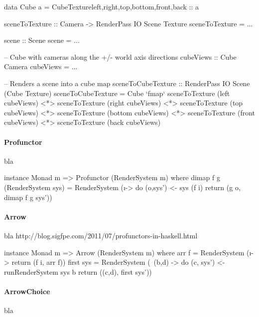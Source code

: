 \begin{haskell}[label={lst:rendersystem-applicative-beispiel},caption={Applicative RenderSystem Beispiel}]
data Cube a = CubeTexture{left,right,top,bottom,front,back :: a}

sceneToTexture :: Camera -> RenderPass IO Scene Texture
sceneToTexture = ...

scene :: Scene
scene = ...

-- Cube with cameras along the +/- world axis directions
cubeViews :: Cube Camera
cubeViews = ...

-- Renders a scene into a cube map
sceneToCubeTexture :: RenderPass IO Scene (Cube Texture)
sceneToCubeTexture = Cube
	`fmap` sceneToTexture (left cubeViews)
	<*> sceneToTexture (right  cubeViews)
	<*> sceneToTexture (top    cubeViews)
	<*> sceneToTexture (bottom cubeViews)
	<*> sceneToTexture (front  cubeViews)
	<*> sceneToTexture (back   cubeViews)
\end{haskell}


\paragraph{Profunctor}
bla

\begin{haskell}[label={lst:rendersystem-profunctor},caption={Profunctor Instanz für RenderSystem}]
instance Monad m => Profunctor (RenderSystem m) where
  dimap f g (RenderSystem sys) = RenderSystem (\i -> do
    (o,sys') <- sys (f i)
    return (g o, dimap f g sys'))
\end{haskell}

\paragraph{Arrow}
bla http://blog.sigfpe.com/2011/07/profunctors-in-haskell.html
\cite{Asada2010}

\begin{haskell}[label={lst:rendersystem-arrow},caption={Arrow Instanz für RenderSystem}]
instance Monad m => Arrow (RenderSystem m) where
  arr f = RenderSystem (\i -> return (f i, arr f))
  first sys = RenderSystem (\ (b,d) -> do
    (c, sys') <- runRenderSystem sys b
    return ((c,d), first sys'))
\end{haskell}

\paragraph{ArrowChoice}
bla

